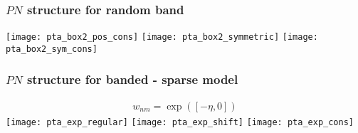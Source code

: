 \documentclass{beamer}
\begin{document}
\begin{frame}\frametitle{$PN$ structure for random band}
\begin{center}
\vspace{-10pt}\texttt{[image: pta\_box2\_pos\_cons]}\vspace{+5pt}\newline
\texttt{[image: pta\_box2\_symmetric]}\newline
\vspace{-0pt}\texttt{[image: pta\_box2\_sym\_cons]}\newline
\end{center}
\end{frame}
\begin{frame}\frametitle{$PN$ structure for banded - sparse model}
\begin{center}
\vspace{-20pt}

\begin{align*}
w_{nm} =
\exp([-\eta, 0]) 
\end{align*}
\texttt{[image: pta\_exp\_regular]}\newline
\texttt{[image: pta\_exp\_shift]}\newline
\texttt{[image: pta\_exp\_cons]}\newline
\end{center}
\end{frame}
\end{document}

